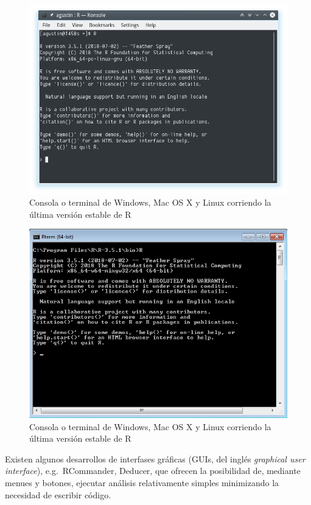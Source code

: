 \documentclass[a4paper]{book}
\begin{document}
\begin{figure}[h]

{\centering \includegraphics[width=0.75\linewidth,]{images/consola_linux} 

}

\caption{Consola o terminal de Windows, Mac OS X y Linux corriendo la última versión estable de R}\label{fig:unnamed-chunk-31}
\end{figure}
\begin{figure}[h]

{\centering \includegraphics[width=0.75\linewidth,]{images/consola_windows} 

}

\caption{Consola o terminal de Windows, Mac OS X y Linux corriendo la última versión estable de R}\label{fig:unnamed-chunk-32}
\end{figure}

Existen algunos desarrollos de interfases gráficas (GUIs, del inglés
\emph{graphical user interface}), e.g.~RCommander, Deducer, que ofrecen
la posibilidad de, mediante menues y botones, ejecutar análisis
relativamente simples minimizando la necesidad de escribir código.
\end{document}
